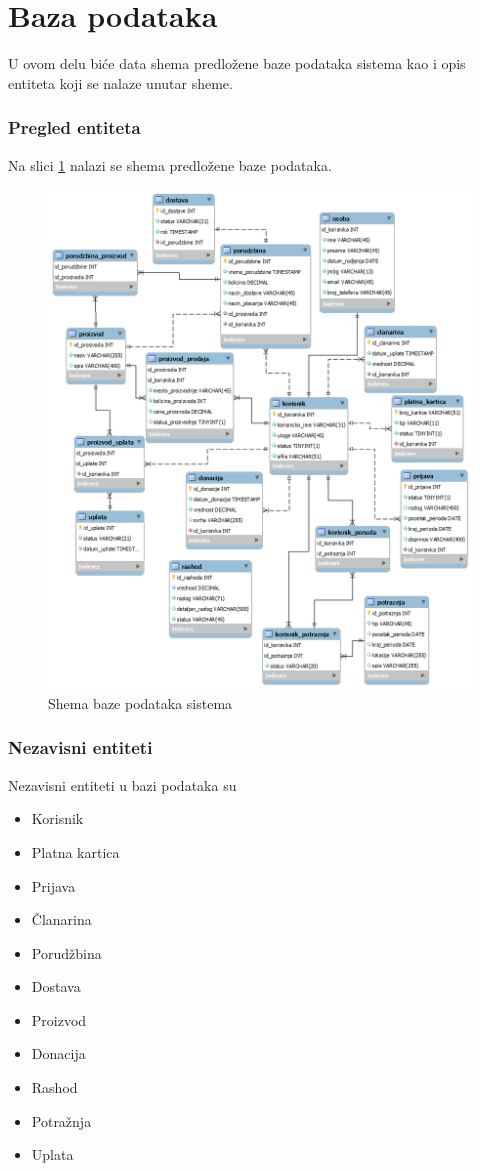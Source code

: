 \documentclass[a4paper, oneside]{article}
\begin{document}
\section{Baza podataka}
\label{baza_podataka}

U ovom delu biće data shema predložene baze podataka sistema kao i opis entiteta koji se nalaze unutar sheme.

\subsubsection{Pregled entiteta}
Na slici \ref{predlog_baze_sistema} nalazi se shema predložene baze podataka. 
\begin{figure}[h!]
    \centering
    \includegraphics[scale=0.42]{images/baza.png}
    \caption{Shema baze podataka sistema}
    \label{predlog_baze_sistema}
\end{figure}

\subsubsection{Nezavisni entiteti}
Nezavisni entiteti u bazi podataka su
\begin{itemize}
    \item Korisnik
    \item Platna kartica
    \item Prijava
    \item Članarina
    \item Porudžbina
    \item Dostava
    \item Proizvod
    \item Donacija
    \item Rashod
    \item Potražnja
    \item Uplata
\end{itemize}
\end{document}
